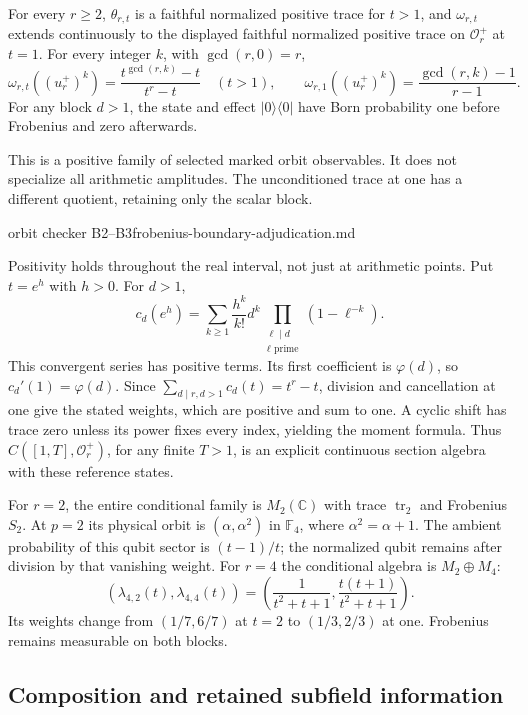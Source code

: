 \begin{proposition}
\statusProved\quad
For every $r\geq2$, $\theta_{r,t}$ is a faithful normalized positive
trace for $t>1$, and $\omega_{r,t}$ extends continuously to the displayed
faithful normalized positive trace on $\mathcal O_r^+$ at $t=1$.
For every integer $k$, with $\gcd(r,0)=r$,
\[
 \omega_{r,t}((u_r^+)^k)=\frac{t^{\gcd(r,k)}-t}{t^r-t}\quad(t>1),
 \qquad
 \omega_{r,1}((u_r^+)^k)=\frac{\gcd(r,k)-1}{r-1}.
\]
For any block $d>1$, the state and effect $|0\rangle\langle0|$ have
Born probability one before Frobenius and zero afterwards.
\end{proposition}
\begin{scope}
This is a positive family of selected marked orbit observables. It does
not specialize all arithmetic amplitudes. The unconditioned trace at one
has a different quotient, retaining only the scalar block.
\end{scope}
{orbit checker B2--B3}{frobenius-boundary-adjudication.md}

Positivity holds throughout the real interval, not just at arithmetic
points. Put $t=e^h$ with $h>0$. For $d>1$,
\[
 c_d(e^h)=\sum_{k\geq1}\frac{h^k}{k!}
 d^k\prod_{\substack{\ell\mid d\\\ell\text{ prime}}}(1-\ell^{-k}).
\]
This convergent series has positive terms. Its first coefficient is
$\varphi(d)$, so $c_d'(1)=\varphi(d)$. Since
$\sum_{d\mid r,d>1}c_d(t)=t^r-t$, division and cancellation at one give
the stated weights, which are positive and sum to one. A cyclic shift has
trace zero unless its power fixes every index, yielding the moment formula.
Thus $C([1,T],\mathcal O_r^+)$, for any finite $T>1$, is an explicit
continuous section algebra with these reference states.

For $r=2$, the entire conditional family is $M_2(\mathbb C)$ with trace
$\operatorname{tr}_2$ and Frobenius $S_2$. At $p=2$ its physical orbit is
$(\alpha,\alpha^2)$ in $\mathbb F_4$, where $\alpha^2=\alpha+1$.
The ambient probability of this qubit sector is $(t-1)/t$; the normalized
qubit remains after division by that vanishing weight. For $r=4$ the
conditional algebra is $M_2\oplus M_4$:
\[
 (\lambda_{4,2}(t),\lambda_{4,4}(t))
   =\left(\frac1{t^2+t+1},\frac{t(t+1)}{t^2+t+1}\right).
\]
Its weights change from $(1/7,6/7)$ at $t=2$ to $(1/3,2/3)$ at one.
Frobenius remains measurable on both blocks.

\subsection{Composition and retained subfield information}

